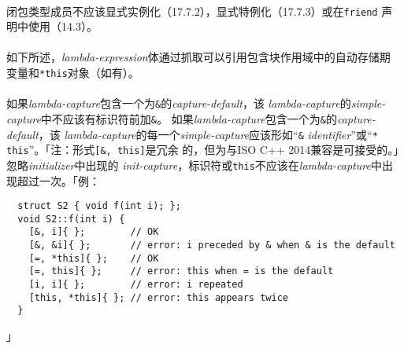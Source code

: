 \paragraph{}
闭包类型成员不应该显式实例化（17.7.2），显式特例化（17.7.3）或在\texttt{friend}
声明中使用（14.3）。

  \synprd{\texttt{\&}}
  \synprd{\texttt{=}}

\paragraph{}
如下所述，\textit{lambda-expression}体通过抓取可以引用包含块作用域中的自动存储期
变量和\texttt{*this}对象（如有）。

\paragraph{}
如果\textit{lambda-capture}包含一个为\texttt{\&}的\textit{capture-default}，该
\textit{lambda-capture}的\textit{simple-capture}中不应该有标识符前加\texttt{\&}。
如果\textit{lambda-capture}包含一个为\texttt{\&}的\textit{capture-default}，该
\textit{lambda-capture}的每一个\textit{simple-capture}应该形如``\texttt{\&}
\textit{identifier}''或``\texttt{* this}''。「注：形式\texttt{[\&, this]}是冗余
的，但为与ISO C++ 2014兼容是可接受的。」忽略\textit{initializer}中出现的
\textit{init-capture}，标识符或\texttt{this}不应该在\textit{lambda-capture}中出
现超过一次。「例：
\begin{lstlisting}
  struct S2 { void f(int i); };
  void S2::f(int i) {
    [&, i]{ };        // OK
    [&, &i]{ };       // error: i preceded by & when & is the default
    [=, *this]{ };    // OK
    [=, this]{ };     // error: this when = is the default
    [i, i]{ };        // error: i repeated
    [this, *this]{ }; // error: this appears twice
  }
\end{lstlisting}」

